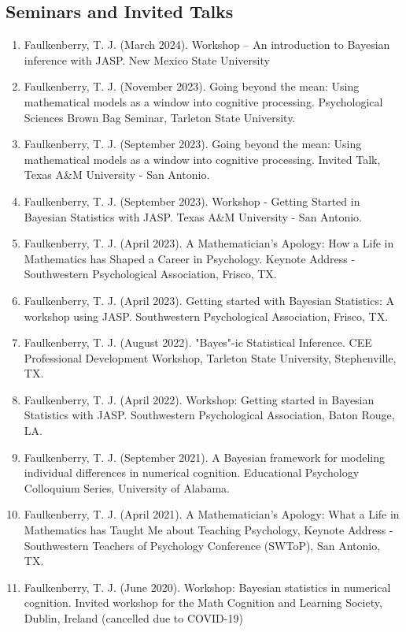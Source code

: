 \documentclass[article,10pt]{article}
\begin{document}
\subsection*{Seminars and Invited Talks}
\label{sec:orgfc82155}
\begin{enumerate}
\item Faulkenberry, T. J. (March 2024). Workshop -- An introduction to Bayesian inference with JASP. New Mexico State University
\item Faulkenberry, T. J. (November 2023). Going beyond the mean: Using mathematical models as a window into cognitive processing. Psychological Sciences Brown Bag Seminar, Tarleton State University.
\item Faulkenberry, T. J. (September 2023). Going beyond the mean: Using mathematical models as a window into cognitive processing. Invited Talk, Texas A\&M University - San Antonio.
\item Faulkenberry, T. J. (September 2023). Workshop - Getting Started in Bayesian Statistics with JASP. Texas A\&M University - San Antonio.
\item Faulkenberry, T. J. (April 2023). A Mathematician's Apology: How a Life in Mathematics has Shaped a Career in Psychology. Keynote Address - Southwestern Psychological Association, Frisco, TX.
\item Faulkenberry, T. J. (April 2023). Getting started with Bayesian Statistics: A workshop using JASP. Southwestern Psychological Association, Frisco, TX.
\item Faulkenberry, T. J. (August 2022). "Bayes"-ic Statistical Inference. CEE Professional Development Workshop, Tarleton State University, Stephenville, TX.
\item Faulkenberry, T. J. (April 2022). Workshop: Getting started in Bayesian Statistics with JASP. Southwestern Psychological Association, Baton Rouge, LA.
\item Faulkenberry, T. J. (September 2021). A Bayesian framework for modeling individual differences in numerical cognition. Educational Psychology Colloquium Series, University of Alabama.
\item Faulkenberry, T. J. (April 2021). A Mathematician's Apology: What a Life in Mathematics has Taught Me about Teaching Psychology,  Keynote Address - Southwestern Teachers of Psychology Conference (SWToP), San Antonio, TX.
\item Faulkenberry, T. J. (June 2020). Workshop: Bayesian statistics in numerical cognition. Invited workshop for the Math Cognition and Learning Society, Dublin, Ireland (cancelled due to COVID-19)

\end{enumerate}
\end{document}
